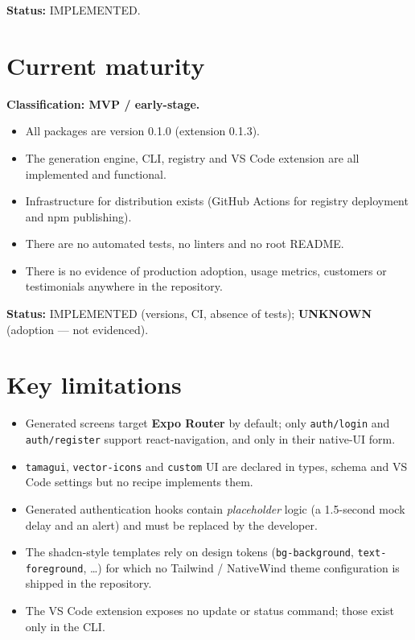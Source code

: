 \textbf{Status:} IMPLEMENTED.

\section{Current maturity}

\textbf{Classification: MVP / early-stage.}

\begin{itemize}
  \item All packages are version 0.1.0 (extension 0.1.3).
  \item The generation engine, CLI, registry and VS Code extension are all
        implemented and functional.
  \item Infrastructure for distribution exists (GitHub Actions for registry
        deployment and npm publishing).
  \item There are no automated tests, no linters and no root README.
  \item There is no evidence of production adoption, usage metrics, customers or
        testimonials anywhere in the repository.
\end{itemize}

\textbf{Status:} IMPLEMENTED (versions, CI, absence of tests);
\textbf{UNKNOWN} (adoption --- not evidenced).

\section{Key limitations}

\begin{itemize}
  \item Generated screens target \textbf{Expo Router} by default; only
        \texttt{auth/login} and \texttt{auth/register} support
        react-navigation, and only in their native-UI form.
  \item \texttt{tamagui}, \texttt{vector-icons} and \texttt{custom} UI are
        declared in types, schema and VS Code settings but no recipe implements
        them.
  \item Generated authentication hooks contain \emph{placeholder} logic (a
        1.5-second mock delay and an alert) and must be replaced by the developer.
  \item The shadcn-style templates rely on design tokens
        (\texttt{bg-background}, \texttt{text-foreground}, \dots) for which no
        Tailwind / NativeWind theme configuration is shipped in the repository.
  \item The VS Code extension exposes no update or status command; those exist
        only in the CLI.
\end{itemize}

